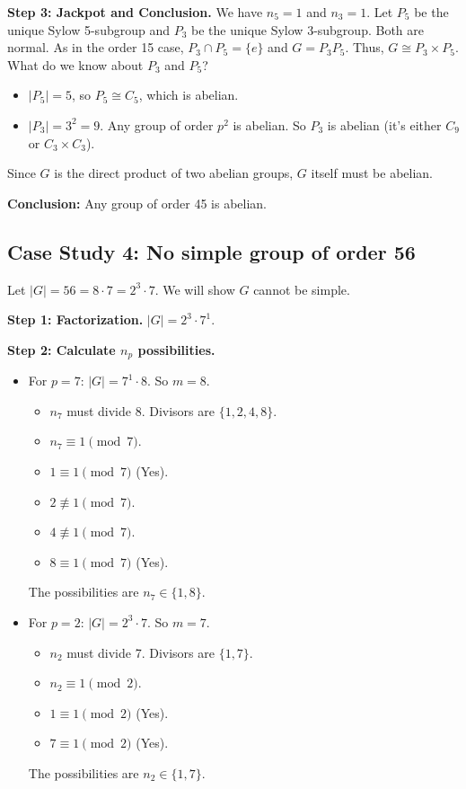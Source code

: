 \documentclass[12pt,a4paper]{article}
\theoremstyle{plain} %
\theoremstyle{definition} %
\theoremstyle{remark} %
\begin{document}
\textbf{Step 3: Jackpot and Conclusion.}
We have $n_5=1$ and $n_3=1$. Let $P_5$ be the unique Sylow 5-subgroup and $P_3$ be the unique Sylow 3-subgroup. Both are normal.
As in the order 15 case, $P_3 \cap P_5 = \{e\}$ and $G = P_3P_5$.
Thus, $G \cong P_3 \times P_5$.
What do we know about $P_3$ and $P_5$?
\begin{itemize}
    \item $|P_5|=5$, so $P_5 \cong C_5$, which is abelian.
    \item $|P_3|=3^2=9$. Any group of order $p^2$ is abelian. So $P_3$ is abelian (it's either $C_9$ or $C_3 \times C_3$).
\end{itemize}
Since $G$ is the direct product of two abelian groups, $G$ itself must be abelian.

\textbf{Conclusion:} Any group of order 45 is abelian.

\newpage
\subsection{Case Study 4: No simple group of order 56}
Let $|G|=56 = 8 \cdot 7 = 2^3 \cdot 7$. We will show $G$ cannot be simple.

\textbf{Step 1: Factorization.} $|G|=2^3 \cdot 7^1$.

\textbf{Step 2: Calculate $n_p$ possibilities.}
\begin{itemize}
    \item For $p=7$: $|G|=7^1 \cdot 8$. So $m=8$.
        \begin{itemize}
            \item $n_7$ must divide 8. Divisors are $\{1, 2, 4, 8\}$.
            \item $n_7 \equiv 1 \pmod{7}$.
                \item $1 \equiv 1 \pmod{7}$ (Yes).
                \item $2 \not\equiv 1 \pmod{7}$.
                \item $4 \not\equiv 1 \pmod{7}$.
                \item $8 \equiv 1 \pmod{7}$ (Yes).
        \end{itemize}
        The possibilities are $n_7 \in \{1, 8\}$.

    \item For $p=2$: $|G|=2^3 \cdot 7$. So $m=7$.
        \begin{itemize}
            \item $n_2$ must divide 7. Divisors are $\{1, 7\}$.
            \item $n_2 \equiv 1 \pmod{2}$.
                \item $1 \equiv 1 \pmod{2}$ (Yes).
                \item $7 \equiv 1 \pmod{2}$ (Yes).
        \end{itemize}
        The possibilities are $n_2 \in \{1, 7\}$.
\end{itemize}
\end{document}
